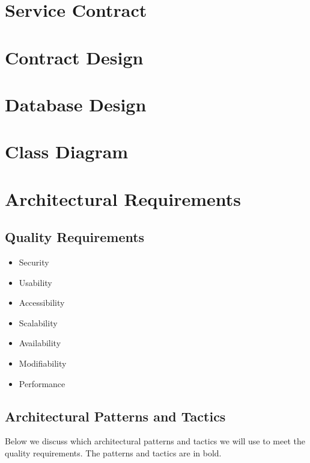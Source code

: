 \documentclass[12pt]{article}
\begin{document}
\newpage

\section{Service Contract}

\newpage

\section{Contract Design}

\newpage

\section{Database Design}

\newpage

\section{Class Diagram}

\newpage

\section{Architectural Requirements}

\subsection{Quality Requirements}

\begin{itemize}
    \item Security
    \item Usability
    \item Accessibility
    \item Scalability
    \item Availability
    \item Modifiability
    \item Performance
  \end{itemize}

\subsection{Architectural Patterns and Tactics}

Below we discuss which architectural patterns and tactics we will use to meet the quality requirements. The patterns and tactics are in bold.
\end{document}
